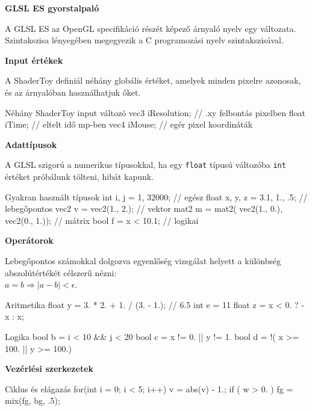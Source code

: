



\begin{multicols*}{2}
{\Large \bf GLSL ES gyorstalpaló}

A GLSL ES az OpenGL specifikáció részét képező árnyaló nyelv egy változata.
Szintakszisa lényegében megegyezik a C programozási nyelv szintakszisával.

\textbf{Input értékek}

A ShaderToy definiál néhány globális értéket,
amelyek minden pixelre azonosak, és az árnyalóban használhatjuk őket.

\begin{glsl}{Néhány ShaderToy input változó}
vec3  iResolution; // .xy felbontás pixelben
float iTime;       // eltelt idő mp-ben
vec4  iMouse;      // egér pixel koordináták
\end{glsl}
  
\textbf{Adattípusok}

A GLSL szigorú a numerikus típusokkal, ha egy \texttt{float} típusú változóba
\texttt{int} értéket próbálunk tölteni, hibát kapunk.

\begin{glsl}{Gyakran használt típusok}
int i, j = 1, 32000;         // egész
float x, y, z = 3.1, 1., .5; // lebegőpontos
vec2  v = vec2(1., 2.);      // vektor
mat2 m = mat2(
    vec2(1., 0.),
    vec2(0., 1.));           // mátrix
bool f = x < 10.1;           // logikai 
\end{glsl}

\textbf{Operátorok}

Lebegőpontos számokkal dolgozva egyenlőség
vizsgálat helyett a különbség abszolútértékét
célszerű nézni:\\ $ a = b \Rightarrow \mid a - b \mid < \epsilon$.

\begin{glsl}{Aritmetika}
float y = 3. * 2. + 1. / (3. - 1.); // 6.5
int   e = 11 %
float z = x < 0. ? -x : x;
\end{glsl}
    
\begin{glsl}{Logika}
bool b = i < 10 && j < 20
bool c = x != 0. || y != 1.
bool d = !( x >= 100. || y >= 100.)
\end{glsl}

\textbf{Vezérlési szerkezetek}
\begin{glsl}{Ciklus és elágazás}
for(int i = 0; i < 5; i++) {
    v = abs(v) - 1.;
}
if ( w > 0. ) { fg = mix(fg, bg, .5); }
\end{glsl}


\end{multicols*}
